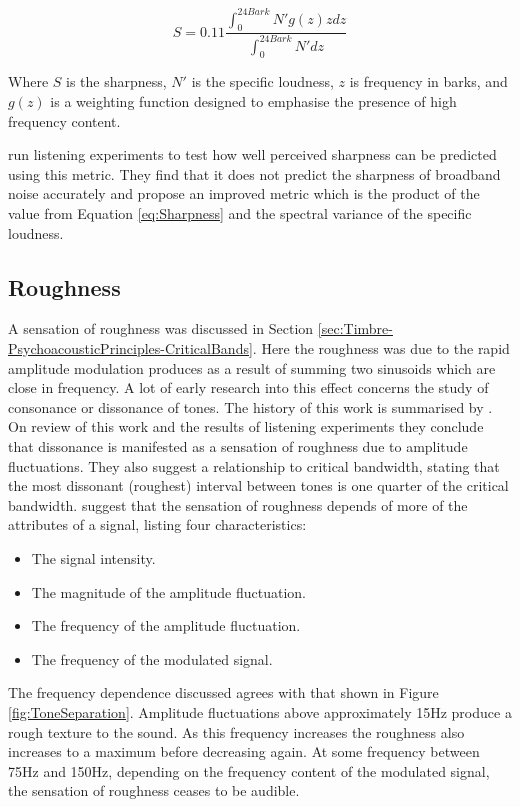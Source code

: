		\begin{equation}
			S = 0.11\frac{\int_{0}^{24Bark} N'g(z)zdz}{\int_{0}^{24Bark}N'dz}
			\label{eq:Sharpness}
		\end{equation}

		Where $S$ is the sharpness, $N'$ is the specific loudness, $z$ is frequency in barks, and $g(z)$ is a
		weighting function designed to emphasise the presence of high frequency content.

		\citet{marui2006predicting} run listening experiments to test how well perceived sharpness can be predicted
		using this metric. They find that it does not predict the sharpness of broadband noise accurately and
		propose an improved metric which is the product of the value from Equation \ref{eq:Sharpness} and the
		spectral variance of the specific loudness.

	\subsection{Roughness}
	\label{sec:Timbre-TimbralFeatures-Roughness}
		A sensation of roughness was discussed in Section \ref{sec:Timbre-PsychoacousticPrinciples-CriticalBands}.
		Here the roughness was due to the rapid amplitude modulation produces as a result of summing two sinusoids
		which are close in frequency. A lot of early research into this effect concerns the study of consonance or
		dissonance of tones. The history of this work is summarised by \citet{plomp1965tonal}. On review of this
		work and the results of listening experiments they conclude that dissonance is manifested as a sensation of
		roughness due to amplitude fluctuations. They also suggest a relationship to critical bandwidth, stating
		that the most dissonant (roughest) interval between tones is one quarter of the critical bandwidth.
		\citet{vassilakis2010psychoacoustic} suggest that the sensation of roughness depends of more of the
		attributes of a signal, listing four characteristics:

		\begin{itemize}
			\item The signal intensity.
			\item The magnitude of the amplitude fluctuation.
			\item The frequency of the amplitude fluctuation.
			\item The frequency of the modulated signal.
		\end{itemize}

		The frequency dependence discussed agrees with that shown in Figure \ref{fig:ToneSeparation}. Amplitude
		fluctuations above approximately 15Hz produce a rough texture to the sound. As this frequency increases the
		roughness also increases to a maximum before decreasing again. At some frequency between 75Hz and 150Hz,
		depending on the frequency content of the modulated signal, the sensation of roughness ceases to be
		audible.

